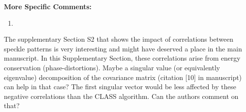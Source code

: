 \documentclass[12pt]{article}
\newenvironment{solved_reviewercomment}
    {\begin{tcolorbox}[width=\linewidth,colback=gray!5,colframe=solved_commentcolor!50,title=Reviewer Comment,left=5pt,right=5pt]}
    {\end{tcolorbox}}
\begin{document}
\textbf{More Specific Comments:}


\begin{enumerate}[label=\arabic*., resume]
\item \leavevmode
\end{enumerate}
\vspace{-1em}
\begin{solved_reviewercomment}
    The supplementary Section S2 that shows the impact of correlations between speckle patterns is very interesting and might have deserved a place in the main manuscript. In this Supplementary Section, these correlations arise from energy conservation (phase-distortions). Maybe a singular value (or equivalently eigenvalue) decomposition of the covariance matrix \cite{badon2020distortion}(citation [10] in manuscript) can help in that case? The first singular vector would be less affected by these negative correlations than the CLASS algorithm. Can the authors comment on that? 
\end{solved_reviewercomment}
\end{document}
